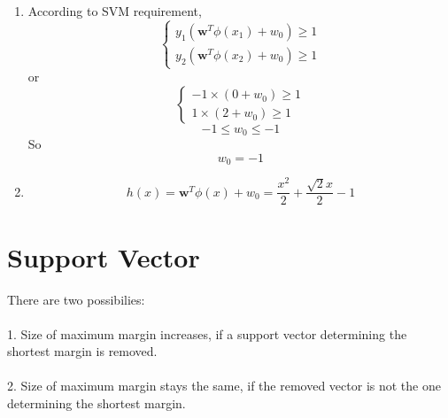 \documentclass{article}
\begin{document}
\begin{enumerate}[label=\alph*.]
            \item %
            According to SVM requirement,
            \begin{equation}
            	\begin{cases}
               		y_1(\boldsymbol{w}^T\phi(x_1)+w_0)
            		\geqslant 1\\
               		y_2(\boldsymbol{w}^T\phi(x_2)+w_0)
            		\geqslant 1
            	\end{cases}
            \end{equation}
            or
            \begin{equation}
            	\begin{cases}
               		-1\times(0+w_0)
            		\geqslant 1\\
               		1\times(2+w_0)
            		\geqslant 1
            	\end{cases}
            \end{equation}
            \begin{equation}
            	-1 \leqslant w_0 \leqslant -1
            \end{equation}
            So
            \begin{equation}
            	w_0 = -1
            \end{equation}
            
            \item %
            \begin{equation}
            	h(x)=\boldsymbol{w}^T\phi(x)+w_0
            	=\frac{x^2}{2}+\frac{\sqrt{2}x}{2}-1
            \end{equation}
        \end{enumerate}    
        
        \section{Support Vector}
        There are two possibilies:\\\\
        1. Size of maximum margin increases, if a support vector determining the shortest margin is removed.\\\\
        2. Size of maximum margin stays the same, if the removed vector is not the one determining the shortest margin.
        
\end{document}
